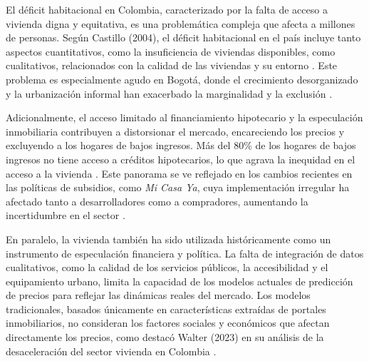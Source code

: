 El déficit habitacional en Colombia, caracterizado por la falta de acceso a vivienda digna y equitativa, es una problemática compleja que afecta a millones de personas. Según Castillo (2004), el déficit habitacional en el país incluye tanto aspectos cuantitativos, como la insuficiencia de viviendas disponibles, como cualitativos, relacionados con la calidad de las viviendas y su entorno \cite{castillo2004anotaciones}. Este problema es especialmente agudo en Bogotá, donde el crecimiento desorganizado y la urbanización informal han exacerbado la marginalidad y la exclusión \cite{castillo2004anotaciones}.

Adicionalmente, el acceso limitado al financiamiento hipotecario y la especulación inmobiliaria contribuyen a distorsionar el mercado, encareciendo los precios y excluyendo a los hogares de bajos ingresos. Más del 80\% de los hogares de bajos ingresos no tiene acceso a créditos hipotecarios, lo que agrava la inequidad en el acceso a la vivienda \cite{castillo2004anotaciones}. Este panorama se ve reflejado en los cambios recientes en las políticas de subsidios, como \textit{Mi Casa Ya}, cuya implementación irregular ha afectado tanto a desarrolladores como a compradores, aumentando la incertidumbre en el sector \cite{coyunturaVivienda2023}.

En paralelo, la vivienda también ha sido utilizada históricamente como un instrumento de especulación financiera y política. La falta de integración de datos cualitativos, como la calidad de los servicios públicos, la accesibilidad y el equipamiento urbano, limita la capacidad de los modelos actuales de predicción de precios para reflejar las dinámicas reales del mercado. Los modelos tradicionales, basados únicamente en características extraídas de portales inmobiliarios, no consideran los factores sociales y económicos que afectan directamente los precios, como destacó Walter (2023) en su análisis de la desaceleración del sector vivienda en Colombia \cite{coyunturaVivienda2023, fortaleciendoVivienda2024}.
